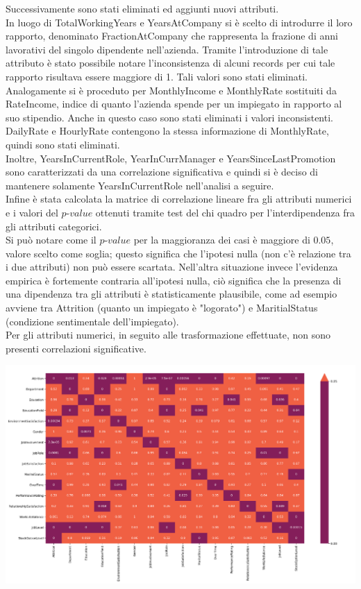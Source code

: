 \documentclass[a4paper,9pt]{article}
\begin{document}
Successivamente sono stati eliminati ed aggiunti nuovi attributi.\\
In luogo di TotalWorkingYears e YearsAtCompany si è scelto di introdurre il loro rapporto, denominato FractionAtCompany che rappresenta la frazione di anni lavorativi del singolo dipendente nell'azienda. Tramite l'introduzione di tale attributo è stato possibile notare l'inconsistenza di alcuni records per cui tale rapporto risultava essere maggiore di 1. Tali valori sono stati eliminati. Analogamente si è proceduto per MonthlyIncome e MonthlyRate sostituiti da RateIncome, indice di quanto l'azienda spende per un impiegato in rapporto al suo stipendio. Anche in questo caso sono stati eliminati i valori inconsistenti.\\ 
DailyRate e HourlyRate contengono la stessa informazione di MonthlyRate, quindi sono stati eliminati.\\
Inoltre, YearsInCurrentRole, YearInCurrManager e YearsSinceLastPromotion sono caratterizzati da una correlazione significativa e quindi si è deciso di mantenere solamente YearsInCurrentRole nell'analisi a seguire.\\
Infine è stata calcolata la matrice di correlazione lineare fra gli attributi numerici e i valori del $p$-$value$  ottenuti tramite test del chi quadro per l'interdipendenza fra gli attributi categorici.\\
Si può notare come il $p$-$value$ per la maggioranza dei casi è maggiore di $0.05$, valore scelto come soglia; questo significa che l'ipotesi nulla (non c'è relazione tra i due attributi) non può essere scartata. Nell'altra situazione invece l'evidenza empirica è fortemente contraria all'ipotesi nulla, ciò significa che la presenza di una dipendenza tra gli attributi è statisticamente plausibile, come ad esempio avviene tra Attrition (quanto un impiegato è "logorato") e MaritialStatus (condizione sentimentale dell'impiegato).\\
Per gli attributi numerici, in seguito alle trasformazione effettuate, non sono presenti correlazioni significative.

\begin{center}
\includegraphics[scale=1.2]{mccat.png}
\end{center}
\end{document}
